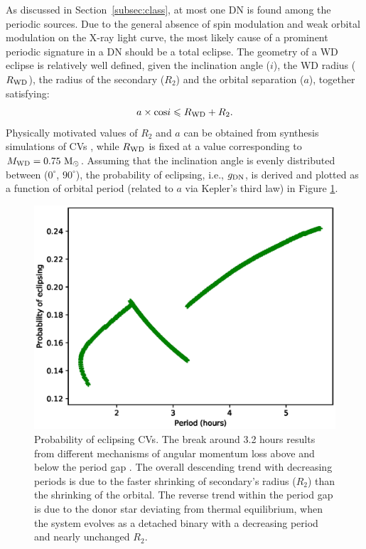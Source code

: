 \documentclass[fleqn,usenatbib]{mnras}
\begin{document}
As discussed in Section~\ref{subsec:class}, at most one DN is found among the periodic sources. Due to the general absence of spin modulation and weak orbital modulation on the X-ray light curve, the most likely cause of a prominent periodic signature in a DN should be a total eclipse. 
The geometry of a WD eclipse is relatively well defined, given the inclination angle ($i$), the WD radius ($R_{\rm WD}$), the radius of the secondary ($R_2$) and the orbital separation ($a$), together satisfying: 
\begin{equation}
{a \times {\rm cos}i}\leq {R_{\rm WD}+R_2}.
\end{equation}
Physically motivated values of $R_2$ and $a$ can be obtained from synthesis simulations of CVs \citep{2011ApJS..194...28K}, while $R_{\rm WD}$ is fixed at a value corresponding to $M_{\rm WD} = 0.75 {\rm~M_\odot}$.
Assuming that the inclination angle is evenly distributed between ($0^\circ$, $90^\circ$), the probability of eclipsing, i.e., $g_{\rm DN}$, is derived and plotted as a function of orbital period (related to $a$ via Kepler's third law) in Figure \ref{fig:simpCV}. 
\begin{figure}
\centering
\includegraphics[scale=0.55]{./figure/sim_LW/p_inCV.eps}
\caption{Probability of eclipsing CVs. The break around 3.2 hours results from different mechanisms of angular momentum loss above and below the period gap \citep{2011ApJS..194...28K}.
The overall descending trend with decreasing periods is due to the faster shrinking of secondary's radius ($R_2$) than the shrinking of the orbital.
The reverse trend within the period gap is due to the donor star deviating from thermal equilibrium, when the system evolves as a detached binary with a decreasing period and nearly unchanged $R_2$.
\label{fig:simpCV}}
\end{figure}
\end{document}
